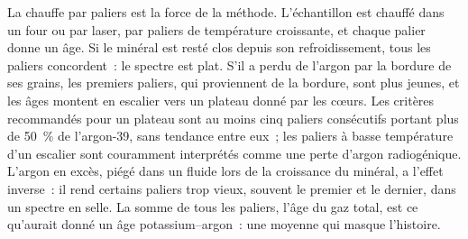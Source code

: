 La chauffe par paliers est la force de la méthode. L'échantillon est chauffé dans un four
ou par laser, par paliers de température croissante, et chaque palier donne un âge.
Si le minéral est resté clos depuis son refroidissement, tous les paliers concordent~: le spectre est
plat. S'il a perdu de l'argon par la bordure de ses grains, les premiers paliers, qui
proviennent de la bordure, sont plus jeunes, et les âges montent en escalier vers un
plateau donné par les cœurs. Les critères recommandés pour un plateau sont au
moins cinq paliers consécutifs portant plus de \qty{50}{\percent} de
l'argon-39, sans tendance entre eux~; les paliers à basse température d'un escalier
sont couramment interprétés comme une perte d'argon radiogénique. L'argon en excès, piégé dans un
fluide lors de la croissance du minéral, a l'effet inverse~: il rend certains paliers trop vieux,
souvent le premier et le dernier, dans un spectre en selle. La somme de tous les
paliers, l'âge du gaz total, est ce qu'aurait donné un âge potassium--argon~: une
moyenne qui masque l'histoire.


